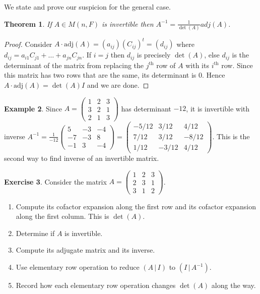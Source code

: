 \documentclass[12pt]{amsart}
\newtheorem{theorem}{Theorem}[section]
\theoremstyle{definition}
\newtheorem{example}[theorem]{Example}
\newtheorem{exercise}[theorem]{Exercise}
\begin{document}
We state and prove our suspicion for the general case.

\begin{theorem}\label{inversebyadjugate} If $A \in M(n, F)$ is invertible then $A^{-1} = \frac{1}{\det(A)} adj(A)$.
\end{theorem}
\begin{proof} Consider $A \cdot \text{adj}(A) = (a_{ij})(C_{ij})^t = (d_{ij})$ where $d_{ij} = a_{i1}C_{j1} + \ldots + a_{jn}C_{jn}$. If $i = j$ then $d_{ij}$ is precisely $\det(A)$, else $d_{ij}$ is the determinant of the matrix from replacing the $j^{\text{th}}$ row of $A$ with its $i^{\text{th}}$ row. Since this matrix has two rows that are the same, its determinant is 0. Hence $A \cdot \text{adj}(A) = \det(A)I$ and we are done.
\end{proof}

\begin{example}\label{} Since $A = \left(\begin{array}{ccc} 1 & 2 & 3\\ 3 & 2 &1\\ 2 & 1 & 3 \end{array}\right)$ has determinant $-12$, it is invertible with inverse $A^{-1} = \frac{1}{-12}\left(\begin{array}{ccc} 5 & -3 & -4 \\ -7 & -3 & 8 \\ -1 & 3 & -4 \end{array}\right) = \left(\begin{array}{ccc} -5/12 & 3/12 & 4/12\\ 7/12 & 3/12 & -8/12 \\ 1/12 & -3/12 & 4/12 \end{array}\right)$. This is the second way to find inverse of an invertible matrix.
\end{example}

\begin{exercise} Consider the matrix $A = \left(\begin{array}{ccc} 1 & 2 & 3 \\ 2 & 3 & 1\\ 3 & 1 & 2 \end{array}\right)$.
\begin{enumerate}[\indent a.]
\item Compute its cofactor expansion along the first row and its cofactor expansion along the first column. This is $\det(A)$.
\item Determine if $A$ is invertible.
\item Compute its adjugate matrix and its inverse.
\item Use elementary row operation to reduce $(A \,|\, I)$ to $(I \,|\, A^{-1})$.
\item Record how each elementary row operation changes $\det(A)$ along the way.
\end{enumerate}
\end{exercise}
\end{document}

